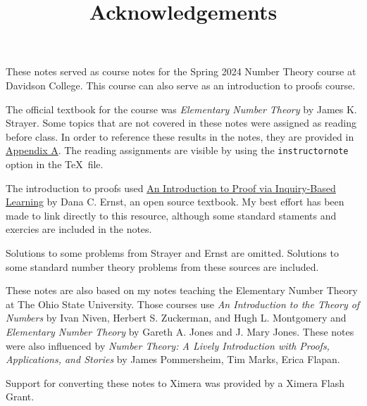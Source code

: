 \documentclass[letterpaper, 11 pt]{ximera}
\title{Acknowledgements}
\begin{document}
These notes served as course notes for the Spring 2024 Number Theory course at Davidson College. This course can also serve as an introduction to proofs course.

The official textbook for the course was 
\emph{Elementary Number Theory} by James K. Strayer. Some topics that are not covered in these notes were assigned as reading before class. In order to reference these results in the notes, they are provided in \hyperref[other-results]{Appendix A}. The reading assignments are visible by using the \verb|instructornote| option in the \TeX\ file. 

The introduction to proofs used \href{https://danaernst.com/IBL-IntroToProof/pretext/root--1-2.html}{An Introduction to Proof via Inquiry-Based Learning} by Dana C. Ernst, an open source textbook. My best effort has been made to link directly to this resource, although some standard staments and exercies are included in the notes.

Solutions to some problems from Strayer and Ernst are omitted. Solutions to some standard number theory problems from these sources are included.

These notes are also based on my notes teaching the Elementary Number Theory at The Ohio State University. Those courses use \emph{An Introduction to the Theory of Numbers}
by Ivan Niven, Herbert S. Zuckerman, and Hugh L. Montgomery and \emph{Elementary Number Theory} by Gareth A. Jones and J. Mary Jones. These notes were also influenced by \emph{Number Theory: A Lively Introduction with Proofs, Applications, and Stories} by James Pommersheim, Tim Marks, Erica Flapan.

Support for converting these notes to Ximera was provided by a Ximera Flash Grant.
\end{document}
